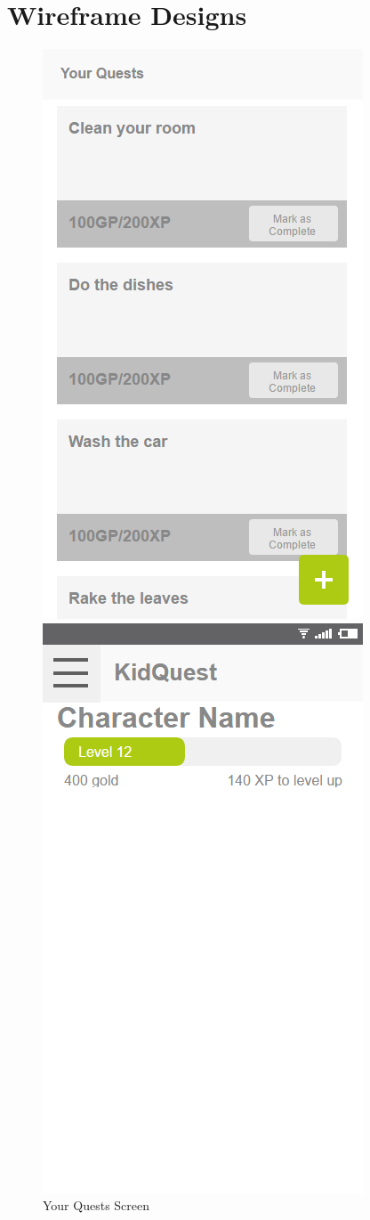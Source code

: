 \chapter{Wireframe Designs}
\label{appendix:wireframes}

\begin{figure}[ht] 
  \label{ fig7} 
  \begin{minipage}[b]{0.5\linewidth}
    \centering
    \includegraphics[width=.5\linewidth, frame]{../images/Wireframes/YourQuestsScreen.png} 
    \caption{Your Quests Screen} 
    \vspace{4ex}
  \end{minipage}%
  \begin{minipage}[b]{0.5\linewidth}
    \centering
    \includegraphics[width=.5\linewidth, frame]{../images/Wireframes/MainScreen.png}

\end{minipage}
\end{figure}
